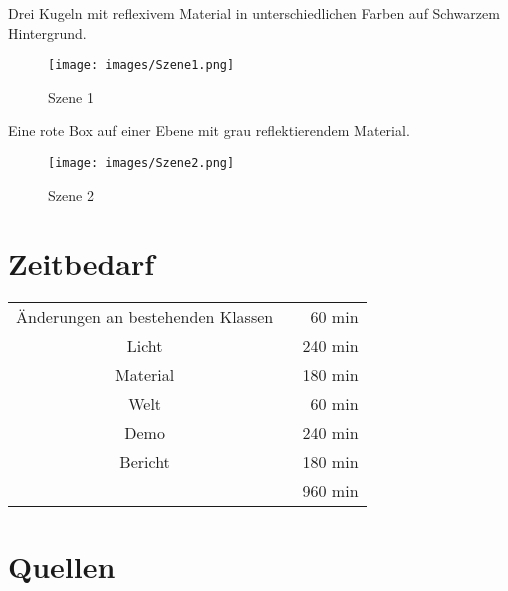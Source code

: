 \documentclass[14pt]{extarticle}
\begin{document}
Drei Kugeln mit reflexivem Material in unterschiedlichen Farben auf Schwarzem Hintergrund. 
\begin{figure}[ht]
\begin{center}
\texttt{[image: images/Szene1.png]}
\caption{Szene 1}
\label{Szene 1}
\end{center}
\end{figure}

Eine rote Box auf einer Ebene mit grau reflektierendem Material.
\begin{figure}[ht]
\begin{center}
\texttt{[image: images/Szene2.png]}
\caption{Szene 2}
\label{Szene 2}
\end{center}
\end{figure}


\section{Zeitbedarf}
\begin{center}
\begin{tabular}{cr}
Änderungen an bestehenden Klassen \	&60 min	\\
Licht	  \	&240 min	\\
Material 	\	&180 min	\\
Welt \	&60 min	\\
Demo \	&240 min	\\
Bericht  \		&180 min	 \\
	\hline
	&960 min
\end{tabular}
\end{center}

\section{Quellen}
\end{document}

